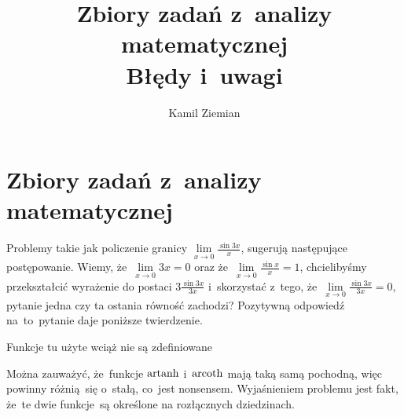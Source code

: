 \documentclass[a4paper,11pt]{article}
\title{Zbiory zadań z~analizy matematycznej \\
  Błędy i~uwagi}
\author{Kamil Ziemian}
\begin{document}





\maketitle  %





\newpage
\section{Zbiory zadań z~analizy matematycznej}

\vspace{\spaceTwo}







\start {} Problemy takie jak policzenie granicy
$\lim\limits_{ x \to 0 } \frac{ \sin 3 x }{ x }$, sugerują następujące
postępowanie. Wiemy, że~$\lim\limits_{ x \to 0 } 3x = 0$ oraz
że~$\lim\limits_{ x \to 0 } \frac{ \sin x }{ x } = 1$, chcielibyśmy
przekształcić wyrażenie do postaci $3 \frac{ \sin 3x }{ 3x }$
i~skorzystać z~tego, że~$\lim\limits_{ x \to 0 } \frac{ \sin 3x }{ 3x } = 0$,
pytanie jedna czy ta ostania równość zachodzi? Pozytywną odpowiedź
na~to~pytanie daje poniższe twierdzenie.

Funkcje tu użyte wciąż nie są zdefiniowane

\vspace{\spaceFour}



\start {} Można
zauważyć, że~funkcje $\operatorname{artanh}$ i~$\operatorname{arcoth}$ mają taką samą pochodną,
więc powinny różnią~się o~stałą, co~jest nonsensem. Wyjaśnieniem
problemu jest fakt, że~te dwie funkcje~są określone na rozłącznych
dziedzinach.

\vspace{\spaceFour}
\end{document}
